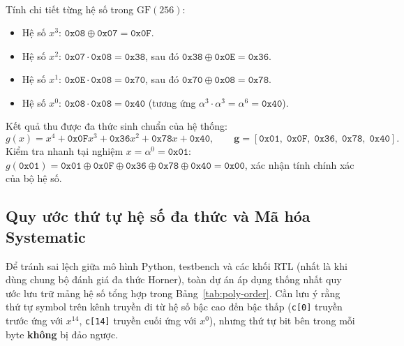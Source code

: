 \documentclass[12pt,a4paper]{report}
\begin{document}
\begin{enumerate}
\begin{align*}
    \end{align*}
    Tính chi tiết từng hệ số trong $\text{GF}(256)$:
    \begin{itemize}
        \item Hệ số $x^3$: $\texttt{0x08} \oplus \texttt{0x07} = \texttt{0x0F}$.
        \item Hệ số $x^2$: $\texttt{0x07} \cdot \texttt{0x08} = \texttt{0x38}$, sau đó $\texttt{0x38} \oplus \texttt{0x0E} = \texttt{0x36}$.
        \item Hệ số $x^1$: $\texttt{0x0E} \cdot \texttt{0x08} = \texttt{0x70}$, sau đó $\texttt{0x70} \oplus \texttt{0x08} = \texttt{0x78}$.
        \item Hệ số $x^0$: $\texttt{0x08} \cdot \texttt{0x08} = \texttt{0x40}$ (tương ứng $\alpha^3 \cdot \alpha^3 = \alpha^6 = \texttt{0x40}$).
    \end{itemize}
\end{enumerate}
Kết quả thu được đa thức sinh chuẩn của hệ thống:
\begin{equation}
    g(x) = x^4 + \texttt{0x0F}x^3 + \texttt{0x36}x^2 + \texttt{0x78}x + \texttt{0x40}, \qquad \mathbf{g} = [\texttt{0x01},\; \texttt{0x0F},\; \texttt{0x36},\; \texttt{0x78},\; \texttt{0x40}].
    \label{eq:gen-poly-final}
\end{equation}
Kiểm tra nhanh tại nghiệm $x = \alpha^0 = \texttt{0x01}$: $g(\texttt{0x01}) = \texttt{0x01} \oplus \texttt{0x0F} \oplus \texttt{0x36} \oplus \texttt{0x78} \oplus \texttt{0x40} = \texttt{0x00}$, xác nhận tính chính xác của bộ hệ số.

\subsection{Quy ước thứ tự hệ số đa thức và Mã hóa Systematic}

Để tránh sai lệch giữa mô hình Python, testbench và các khối RTL (nhất là khi dùng chung bộ đánh giá đa thức Horner), toàn dự án áp dụng thống nhất quy ước lưu trữ mảng hệ số tổng hợp trong Bảng~\ref{tab:poly-order}. Cần lưu ý rằng thứ tự symbol trên kênh truyền đi từ hệ số bậc cao đến bậc thấp (\texttt{c[0]} truyền trước ứng với $x^{14}$, \texttt{c[14]} truyền cuối ứng với $x^0$), nhưng thứ tự bit bên trong mỗi byte \textbf{không} bị đảo ngược.
\end{document}
